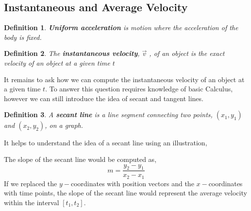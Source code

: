 \documentclass[12pt]{article}
\theoremstyle{break}
\newtheorem{defn}{Definition}[subsection]
\begin{document}
\subsection{Instantaneous and Average Velocity}
\begin{defn}
\textbf{Uniform acceleration} is motion where the acceleration of the body is fixed.
\end{defn}

\begin{defn}
The \textbf{instantaneous velocity}, $\vec v$ , of an object is the \emph{exact} velocity of an object at a given time $t$
\end{defn}

It remains to ask how we can compute the instantaneous velocity of an object at a given time $t$. To answer this question requires knowledge of basic Calculus, however we can still introduce the idea of secant and tangent lines.
\begin{defn}
A \textbf{secant line} is a line segment connecting two points, $(x_1,y_1)$ and $(x_2,y_2)$, on a graph. 
\end{defn}
It helps to understand the idea of a secant line using an illustration,

\begin{center}
\end{center}

The slope of the secant line would be computed as,
$$m = \frac{y_2 - y_1}{x_2 - x_1}$$
If we replaced the $y-$coordinates with position vectors and the $x-$coordinates with time points, the slope of the secant line would represent the average velocity within the interval $[t_1,t_2]$.
\end{document}

